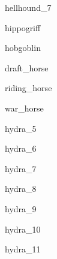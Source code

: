 \documentclass[letterpaper,serif]{module}
\begin{document}
\begin{newmonster}{hellhound_7}\end{newmonster}

\begin{newmonster}{hippogriff}\end{newmonster}

\begin{newmonster}{hobgoblin}\end{newmonster}


\begin{newmonster}{draft_horse}\end{newmonster}

\begin{newmonster}{riding_horse}\end{newmonster}

\begin{newmonster}{war_horse}\end{newmonster}


\begin{newmonster}{hydra_5}\end{newmonster}

\begin{newmonster}{hydra_6}\end{newmonster}

\begin{newmonster}{hydra_7}\end{newmonster}

\begin{newmonster}{hydra_8}\end{newmonster}

\begin{newmonster}{hydra_9}\end{newmonster}

\begin{newmonster}{hydra_10}\end{newmonster}

\begin{newmonster}{hydra_11}\end{newmonster}
\end{document}
